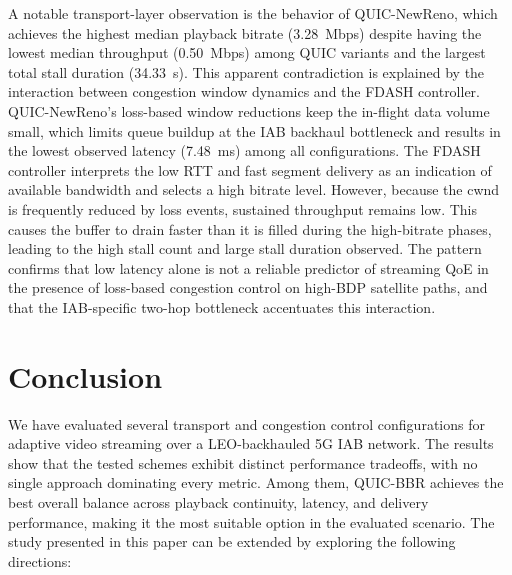\documentclass[journal]{IEEEtran}
\begin{document}
A notable transport-layer observation is the behavior of QUIC-NewReno, which achieves the highest median playback bitrate (3.28~Mbps) despite having the lowest median throughput (0.50~Mbps) among QUIC variants and the largest total stall duration (34.33~s). This apparent contradiction is explained by the interaction between congestion window dynamics and the FDASH controller. QUIC-NewReno's loss-based window reductions keep the in-flight data volume small, which limits queue buildup at the IAB backhaul bottleneck and results in the lowest observed latency (7.48~ms) among all configurations. The FDASH controller interprets the low RTT and fast segment delivery as an indication of available bandwidth and selects a high bitrate level. However, because the cwnd is frequently reduced by loss events, sustained throughput remains low. This causes the buffer to drain faster than it is filled during the high-bitrate phases, leading to the high stall count and large stall duration observed. The pattern confirms that low latency alone is not a reliable predictor of streaming QoE in the presence of loss-based congestion control on high-BDP satellite paths, and that the IAB-specific two-hop bottleneck accentuates this interaction.

\section*{Conclusion}
We have evaluated several transport and congestion control configurations for adaptive video streaming over a LEO-backhauled 5G IAB network. The results show that the tested schemes exhibit distinct performance tradeoffs, with no single approach dominating every metric. Among them, QUIC-BBR achieves the best overall balance across playback continuity, latency, and delivery performance, making it the most suitable option in the evaluated scenario. The study presented in this paper can be extended by exploring the following directions:
\end{document}
